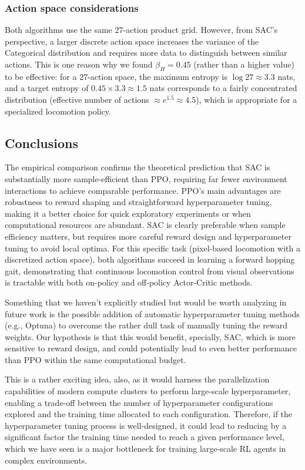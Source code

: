 \documentclass[onecolumn]{cwpreport} %
\begin{document}
\subsubsection{Action space considerations}

Both algorithms use the same 27-action product grid. However, from SAC's perspective, a larger discrete action space increases the variance of the Categorical distribution and requires more data to distinguish between similar actions. This is one reason why we found $\beta_H = 0.45$ (rather than a higher value) to be effective: for a 27-action space, the maximum entropy is $\log 27 \approx 3.3$ nats, and a target entropy of $0.45 \times 3.3 \approx 1.5$ nats corresponds to a fairly concentrated distribution (effective number of actions $\approx e^{1.5} \approx 4.5$), which is appropriate for a specialized locomotion policy.

\subsection{Conclusions}

The empirical comparison confirms the theoretical prediction that SAC is substantially more sample-efficient than PPO, requiring far fewer environment interactions to achieve comparable performance. PPO's main advantages are robustness to reward shaping and straightforward hyperparameter tuning, making it a better choice for quick exploratory experiments or when computational resources are abundant. SAC is clearly preferable when sample efficiency matters, but requires more careful reward design and hyperparameter tuning to avoid local optima. For this specific task (pixel-based locomotion with a discretized action space), both algorithms succeed in learning a forward hopping gait, demonstrating that continuous locomotion control from visual observations is tractable with both on-policy and off-policy Actor-Critic methods.

Something that we haven't explicitly studied but would be worth analyzing in future work is the possible addition of automatic hyperparameter tuning methods (e.g., Optuna) to overcome the rather dull task of manually tuning the reward weights. Our hypothesis is that this would benefit, specially, SAC, which is more sensitive to reward design, and could potentially lead to even better performance than PPO within the same computational budget.

This is a rather exciting idea, also, as it would harness the parallelization capabilities of modern compute clusters to perform large-scale hyperparameter, enabling a trade-off between the number of hyperparameter configurations explored and the training time allocated to each configuration. Therefore, if the hyperparameter tuning process is well-designed, it could lead to reducing by a significant factor the training time needed to reach a given performance level, which we have seen is a major bottleneck for training large-scale RL agents in complex environments.
\end{document}
